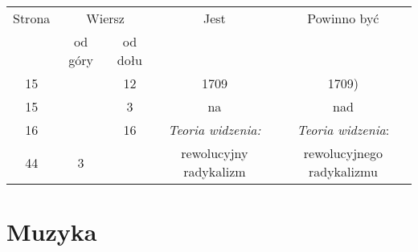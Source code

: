\documentclass[a4paper,11pt]{article}
\numberwithin{equation}{section}
\begin{document}








\begin{center}

  \begin{tabular}{|c|c|c|c|c|}
    \hline
    Strona & \multicolumn{2}{c|}{Wiersz} & Jest
                              & Powinno być \\ \cline{2-3}
    & od góry & od dołu & & \\
    \hline
    15  & & 12 & 1709 & 1709) \\
    15  & &  3 & na & nad \\
    16  & & 16 & \textit{Teoria widzenia:} & \textit{Teoria widzenia}: \\
    44  &  3 & & rewolucyjny radykalizm & rewolucyjnego radykalizmu \\
    \hline
  \end{tabular}

\end{center}

\VerSpaceTwo













\newpage

\section{Muzyka}

\VerSpaceTwo



\end{document}
